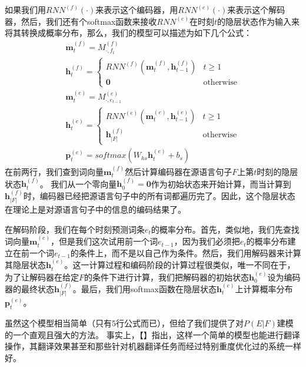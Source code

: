 \documentclass[10pt,a4paper]{ctexart}
\begin{document}
如果我们用$RNN^{(f)}(\cdot)$来表示这个编码器，用$RNN^{(e)}(\cdot)$来表示这个解码器，然后，我们还有个softmax函数来接收$RNN^{(e)}$在时刻$t$的隐层状态作为输入来将其转换成概率分布，那么，我们的模型可以描述为如下几个公式：
\[
 \begin{array}{l}
   \textbf{m}_t^{(f)} = M_{\cdot,f_t}^{(f)} \\
   \textbf{h}_t^{(f)} = \left\{ \begin{array}{ll}
      RNN^{(f)}(\textbf{m}_t^{(f)},\textbf{h}_{t-1}^{(f)}) & t \geq 1 \\
      \textbf{0} & \textrm{otherwise}
      \end{array} \right. \\
   \textbf{m}_t^{(e)} = M_{\cdot,e_{t-1}}^{(e)} \\
   \textbf{h}_t^{(e)} = \left\{ \begin{array}{ll}
      RNN^{(e)}(\textbf{m}_t^{(e)},\textbf{h}_{t-1}^{(e)}) & t \geq 1 \\
      \textbf{h}_{|F|}^{(f)} & \textrm{otherwise}
      \end{array} \right. \\
   \textbf{p}_t^{(e)} = softmax(W_{hs}\textbf{h}_t^{(e)} + b_s)
 \end{array}
\]
在前两行，我们查到词向量$\textbf{m}_t^{(f)}$然后计算编码器在源语言句子$F$上第$t$时刻的隐层状态$\textbf{h}_t^{(f)}$。
我们从一个零向量$\textbf{h}_0^{(f)}=\textbf{0}$作为初始状态来开始计算，而当计算到$\textbf{h}_{|F|}^{(f)}$时，编码器已经把源语言句子中的所有词都遍历完了。因此，这个隐层状态在理论上是对源语言句子中的信息的编码结果了。

在解码阶段，我们在每个时刻预测词条$e_t$的概率分布。首先，类似地，我们先查找词向量$\textbf{m}_t^{(e)}$，但是我们这次试用前一个词$e_{t-1}$，因为我们必须把$e_t$的概率分布建立在前一个词$e_{t-1}$的条件上，而不是以自己作为条件。然后，我们用解码器来计算其隐层状态$\textbf{h}_t^{(e)}$。这一计算过程和编码阶段的计算过程很类似，唯一不同在于，为了让解码器在给定$F$的条件下进行计算，我们把解码器的初始状态$\textbf{h}_0^{(e)}$设为编码器的最终状态$\textbf{h}_{|F|}^{(f)}$。最后，我们用softmax函数在隐层状态$\textbf{h}_t^{(e)}$上计算概率分布$\textbf{p}_t^{(e)}$。

虽然这个模型相当简单（只有5行公式而已），但给了我们提供了对$P(E|F)$建模的一个直观且强大的方法。
事实上，【】指出，这样一个简单的模型也能进行翻译操作，其翻译效果甚至和那些针对机器翻译任务而经过特别重度优化过的系统一样好。
\end{document}
